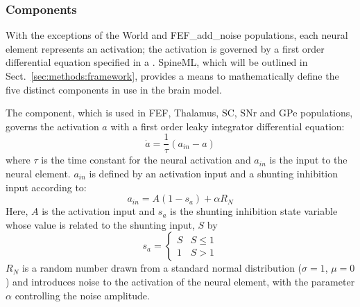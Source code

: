 \documentclass{frontiersSCNS}
\begin{document}

\subsubsection{Components}

With the exceptions of the World and FEF\_add\_noise populations, each
neural element represents an activation; the activation is governed by
a first order differential equation specified in a . SpineML, which will be outlined in
Sect.~\ref{sec:methods:framework}, provides a means to mathematically
define the five distinct components in use in the brain model.

The  component, which is used in FEF, Thalamus, SC, SNr
and GPe populations, governs the activation $a$ with a first order
leaky integrator differential equation:
\begin{equation}
   \dot{a} = \frac{1}{\tau}(a_{in}-a)
\end{equation}
where $\tau$ is the time constant for the neural activation and
$a_{in}$ is the input to the neural element. $a_{in}$ is defined by an
activation input and a shunting inhibition input according to:
\begin{equation}
   a_{in} = A(1-s_a)+\alpha R_N
\end{equation}
Here, $A$ is the activation input and $s_a$ is the shunting inhibition
state variable whose value is related to the shunting input, $S$ by
\begin{equation}
   s_a = \begin{cases}
      S & S\leq 1 \\
      1 & S > 1
   \end{cases}
\end{equation}
$R_N$ is a random number drawn from a standard normal distribution
($\sigma=\mathrm{1}$, $\mu=\mathrm{0}$) and introduces noise to the activation of the
neural element, with the parameter $\alpha$ controlling the noise
amplitude.
\end{document}
